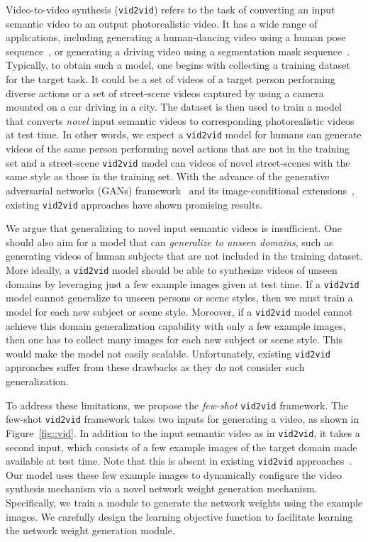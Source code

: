 \documentclass{article}
\newcommand{\vidtovid}{{\texttt{vid2vid}}\xspace}
\begin{document}
Video-to-video synthesis (\vidtovid) refers to the task of converting an input semantic video to an output photorealistic video. It has a wide range of applications, including generating a human-dancing video using a human pose sequence~\cite{chan2018everybody,gafni2019vid2game,wang2018video,zhou2019dance}, or generating a driving video using a segmentation mask sequence~\cite{wang2018video}. Typically, to obtain such a model, one begins with collecting a training dataset for the target task. It could be a set of videos of a target person performing diverse actions or a set of street-scene videos captured by using a camera mounted on a car driving in a city. The dataset is then used to train a model that converts \textit{novel} input semantic videos to corresponding photorealistic videos at test time. In other words, we expect a \vidtovid model for humans can generate videos of the same person performing novel actions that are not in the training set and a street-scene \vidtovid model can videos of novel street-scenes with the same style as those in the training set. With the advance of the generative adversarial networks (GANs) framework~\cite{goodfellow2014generative} and its image-conditional extensions~\cite{isola2017image,wang2017high}, existing \vidtovid approaches have shown promising results.


We argue that generalizing to novel input semantic videos is insufficient. One should also aim for a model that can \textit{generalize to unseen domains}, such as generating videos of human subjects that are not included in the training dataset. More ideally, a \vidtovid model should be able to synthesize videos of unseen domains by leveraging just a few example images given at test time. If a \vidtovid model cannot generalize to unseen persons or scene styles, then we must train a model for each new subject or scene style. Moreover, if a \vidtovid model cannot achieve this domain generalization capability with only a few example images, then one has to collect many images for each new subject or scene style. This would make the model not easily scalable. Unfortunately, existing \vidtovid approaches suffer from these drawbacks as they do not consider such generalization.


To address these limitations, we propose the \textit{few-shot} \vidtovid framework. The few-shot \vidtovid framework takes two inputs for generating a video, as shown in Figure~\ref{fig::vid}. In addition to the input semantic video as in \vidtovid, it takes a second input, which consists of a few example images of the target domain made available at test time. Note that this is absent in existing \vidtovid approaches~\cite{chan2018everybody,gafni2019vid2game,wang2018video,zhou2019dance}. Our model uses these few example images to dynamically configure the video synthesis mechanism via a novel network weight generation mechanism. Specifically, we train a module to generate the network weights using the example images. We carefully design the learning objective function to facilitate learning the network weight generation module.
\end{document}
